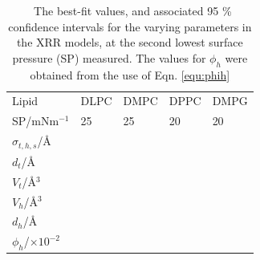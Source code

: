 \documentclass[amsmath,amssymb,superscriptaddress]{revtex4-1}
\begin{document}
\begin{table}
  \centering
	\caption{\ The best-fit values, and associated 95 \% confidence intervals for the varying parameters in the XRR models, at the second lowest surface pressure (SP) measured. The values for $\phi_h$ were obtained from the use of Eqn. \ref{equ:phih}}
	\label{tab:liptab3}
	\begin{tabular}{l|l|l|l|l}
		Lipid & DLPC & DMPC & DPPC & DMPG \\
    SP/mNm$^{-1}$ & 25 & 25 & 20 & 20 \\
		\hline
		$\sigma_{t,h,s}$/\AA &  &  &  &  \\
    $d_t$/\AA &  &  &  &  \\
    \hline
    $V_t$/\AA$^3$ &  &  &  &  \\
		$V_h$/\AA$^3$ &  &  &  &  \\
		$d_h$/\AA &  &  &  &  \\
    \hline
    $\phi_h$/$\times10^{-2}$ &  &  &  &  \\
	\end{tabular}
\end{table}
%
%
\end{document}
